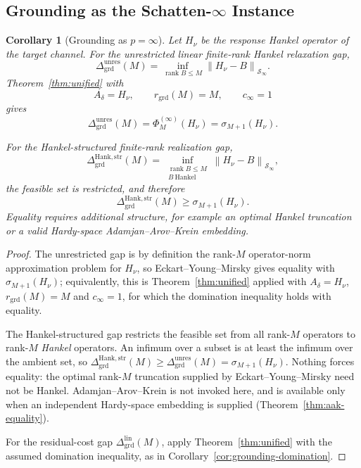 \documentclass[12pt]{article}
\newtheorem{corollary}[theorem]{Corollary}
\theoremstyle{definition}
\DeclareMathOperator{\rank}{rank}
\newcommand{\norm}[1]{\left\lVert#1\right\rVert}
\newcommand{\GrdLin}{\Delta_{\mathrm{grd}}^{\mathrm{lin}}}
\newcommand{\Dunres}{\Delta_{\mathrm{grd}}^{\mathrm{unres}}}
\newcommand{\DHankstr}{\Delta_{\mathrm{grd}}^{\mathrm{Hank,str}}}
\newcommand{\Sp}[1]{\mathcal S_{#1}}
\begin{document}
\subsection{Grounding as the Schatten-$\infty$ Instance}
\label{subsec:schatten-grounding}

\begin{corollary}[Grounding as $p=\infty$]
\label{cor:grd-schatten}
Let $H_\nu$ be the response Hankel operator of the target channel.  For the
unrestricted linear finite-rank Hankel relaxation gap,
\[
\Dunres(M)
=
\inf_{\rank B\le M}
\norm{H_\nu-B}_{\Sp{\infty}}.
\]
Theorem~\ref{thm:unified} with
\[
A_\delta=H_\nu,
\qquad
r_{\mathrm{grd}}(M)=M,
\qquad
c_\infty=1
\]
gives
\[
\Dunres(M)
=
\Phi^{(\infty)}_M(H_\nu)
=
\sigma_{M+1}(H_\nu).
\]

For the Hankel-structured finite-rank realization gap,
\[
\DHankstr(M)
=
\inf_{\substack{
\rank B\le M\\
B\ \text{Hankel}
}}
\norm{H_\nu-B}_{\Sp{\infty}},
\]
the feasible set is restricted, and therefore
\[
\DHankstr(M)
\ge
\sigma_{M+1}(H_\nu).
\]
Equality requires additional structure, for example an optimal Hankel
truncation or a valid Hardy-space Adamjan--Arov--Krein embedding.
\end{corollary}

\begin{proof}
The unrestricted gap is by definition the rank-$M$ operator-norm approximation
problem for $H_\nu$, so Eckart--Young--Mirsky
\cite{eckart1936,mirsky1960} gives equality with $\sigma_{M+1}(H_\nu)$;
equivalently, this is Theorem~\ref{thm:unified} applied with $A_\delta=H_\nu$,
$r_{\mathrm{grd}}(M)=M$ and $c_\infty=1$, for which the domination inequality
holds with equality.

The Hankel-structured gap restricts the feasible set from all rank-$M$
operators to rank-$M$ \emph{Hankel} operators.  An infimum over a subset is at
least the infimum over the ambient set, so
$\DHankstr(M)\ge\Dunres(M)=\sigma_{M+1}(H_\nu)$.  Nothing forces equality: the
optimal rank-$M$ truncation supplied by Eckart--Young--Mirsky need not be
Hankel.  Adamjan--Arov--Krein is not invoked here, and is available only when
an independent Hardy-space embedding is supplied
(Theorem~\ref{thm:aak-equality}).

For the residual-cost gap $\GrdLin(M)$, apply Theorem~\ref{thm:unified} with
the assumed domination inequality, as in
Corollary~\ref{cor:grounding-domination}.
\end{proof}
\end{document}
